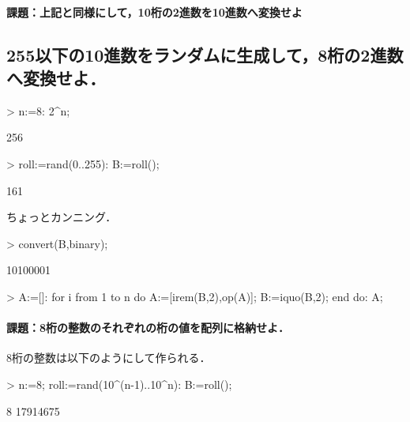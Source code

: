 \paragraph{課題：上記と同様にして，10桁の2進数を10進数へ変換せよ}


\subsection{255以下の10進数をランダムに生成して，8桁の2進数へ変換せよ．}
\begin{MapleInput}
> n:=8: 2^n;
\end{MapleInput}
\begin{MapleError}
                                     256
\end{MapleError}
\begin{MapleInput}
> roll:=rand(0..255):
  B:=roll();
\end{MapleInput}
\begin{MapleError}
                                     161
\end{MapleError}
ちょっとカンニング．
\begin{MapleInput}
> convert(B,binary);
\end{MapleInput}
\begin{MapleError}
                            10100001
\end{MapleError}

\begin{MapleInput}
> A:=[]:
  for i from 1 to n do
    A:=[irem(B,2),op(A)];
    B:=iquo(B,2);
  end do:
  A;
\end{MapleInput}
\begin{MapleOutput}
[1, 0, 1, 0, 0, 0, 0, 1]
\end{MapleOutput}

\paragraph{課題：8桁の整数のそれぞれの桁の値を配列に格納せよ．}
8桁の整数は以下のようにして作られる．
\begin{MapleInput}
> n:=8; 
  roll:=rand(10^(n-1)..10^n): 
  B:=roll();
\end{MapleInput}
\begin{MapleError}
                                      8
                                   17914675
\end{MapleError}
